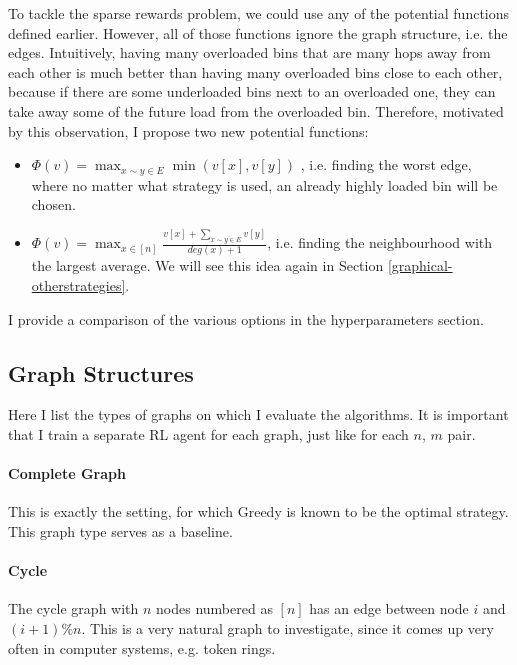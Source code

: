 To tackle the sparse rewards problem, we could use any of the potential functions defined earlier. However, all of those functions ignore the graph structure, i.e. the edges. Intuitively, having many overloaded bins that are many hops away from each other is much better than having many overloaded bins close to each other, because if there are some underloaded bins next to an overloaded one, they can take away some of the future load from the overloaded bin. Therefore, motivated by this observation, I propose two new potential functions:


\begin{itemize}
    \item 
    $\Phi(v)=\max_{x\sim y \in E} \min(v[x], v[y])$ , i.e. finding the worst edge, where no matter what strategy is used, an already highly loaded bin will be chosen.
    \item
    $\Phi(v)=\max_{x \in [n]} \frac{v[x]+\sum_{x\sim y \in E}v[y]}{deg(x)+1}$, i.e. finding the neighbourhood with the largest average. We will see this idea again in Section \ref{graphical-otherstrategies}.
\end{itemize}

I provide a comparison of the various options in the hyperparameters section.


\subsection{Graph Structures}


Here I list the types of graphs on which I evaluate the algorithms. It is important that I train a separate RL agent for each graph, just like for each $n$, $m$ pair.


\paragraph{Complete Graph} This is exactly the \TwoChoice setting, for which Greedy is known to be the optimal strategy. This graph type serves as a baseline.


\paragraph{Cycle} The cycle graph with $n$ nodes numbered as $[n]$ has an edge between node $i$ and $(i+1)\%n$. This is a very natural graph to investigate, since it comes up very often in computer systems, e.g. token rings.


